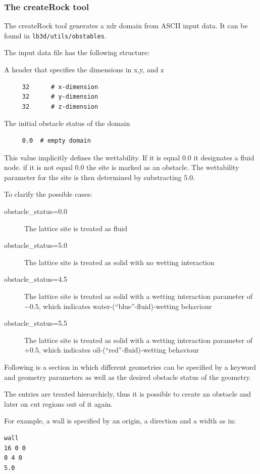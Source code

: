 \documentclass[a4paper]{article}
\begin{document}
\subsubsection{The createRock tool}

The createRock tool generates a xdr domain from ASCII input data. It can be found in {\tt lb3d/utils/obstables}.

The input data file has the following structure:

A header that specifies the dimensions in x,y, and z
\begin{verbatim}
     32      # x-dimension
     32      # y-dimension
     32      # z-dimension
\end{verbatim}

The initial obstacle status of the domain
\begin{verbatim}
     0.0  # empty domain
\end{verbatim}
This value implicitly defines the wettability. If it is equal $0.0$ it designates a fluid node. if it is not equal $0.0$ the site is marked as an obstacle. The wettability parameter for the site is then determined by substracting $5.0$.

To clarify the possible cases:
\begin{description}
\item [obstacle\_status=0.0]
The lattice site is treated as fluid
\item [obstacle\_status=5.0]
The lattice site is treated as solid with no wetting interaction
\item [obstacle\_status=4.5]
The lattice site is treated as solid with a wetting interaction parameter of $-0.5$, which indicates water-(``blue''-fluid)-wetting behaviour
\item [obstacle\_status=5.5]
The lattice site is treated as solid with a wetting interaction parameter of $+0.5$, which indicates oil-(``red''-fluid)-wetting behaviour
\end{description}

Following is a section in which different geometries can be specified by a keyword and geometry parameters as well as the desired obstacle status of the geometry.

The entries are treated hierarchicly, thus it is possible to create an obstacle and later on cut regions out of it again.

For example, a wall is specified by an origin, a direction and a width as in:
\begin{verbatim}
wall
16 0 0
0 4 0
5.0
\end{verbatim}
\end{document}
